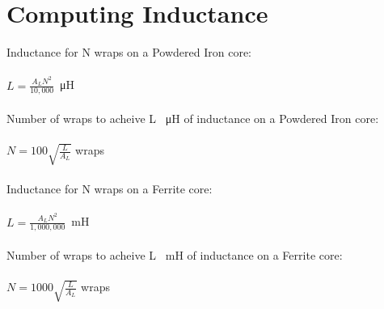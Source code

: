 \documentclass[10pt]{article}
\begin{document}
\section*{Computing Inductance}
Inductance for N wraps on a Powdered Iron core:\\\\
$L=\frac{A_L N^2}{10,000}$\SI{}{\micro\henry}\\\\
Number of wraps to acheive L \SI{}{\micro\henry} of inductance on a Powdered Iron core:\\\\
$N=100\sqrt{\frac{L}{A_L}}$ wraps\\\\
Inductance for N wraps on a Ferrite core:\\\\
$L=\frac{A_L N^2}{1,000,000}$\SI{}{\milli\henry}\\\\
Number of wraps to acheive L \SI{}{\milli\henry} of inductance on a Ferrite core:\\\\
$N=1000\sqrt{\frac{L}{A_L}}$ wraps
\end{document}

